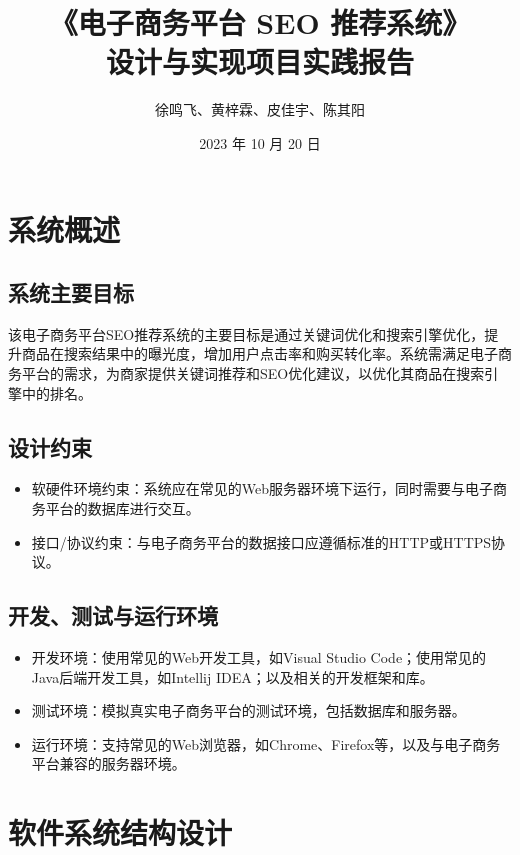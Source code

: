 \documentclass[11pt, a4paper, oneside]{ctexbook}
\title{{\Huge{\textbf{《电子商务平台 SEO 推荐系统》}}}\\设计与实现项目实践报告}
\author{徐鸣飞、黄梓霖、皮佳宇、陈其阳}
\date{2023 年 10 月 20 日}
\begin{document}
\maketitle
{}
\setcounter{page}{1}
\newpage
{}
\setcounter{page}{1}
\tableofcontents
\newpage
\setcounter{page}{1}

\chapter{系统概述}
\section{系统主要目标}
该电子商务平台SEO推荐系统的主要目标是通过关键词优化和搜索引擎优化，提升商品在搜索结果中的曝光度，增加用户点击率和购买转化率。系统需满足电子商务平台的需求，为商家提供关键词推荐和SEO优化建议，以优化其商品在搜索引擎中的排名。
\section{设计约束}
\begin{itemize}
    \item 软硬件环境约束：系统应在常见的Web服务器环境下运行，同时需要与电子商务平台的数据库进行交互。
    \item 接口/协议约束：与电子商务平台的数据接口应遵循标准的HTTP或HTTPS协议。
\end{itemize}
\section{开发、测试与运行环境}
\begin{itemize}
    \item 开发环境：使用常见的Web开发工具，如Visual Studio Code；使用常见的Java后端开发工具，如Intellij IDEA；以及相关的开发框架和库。
    \item 测试环境：模拟真实电子商务平台的测试环境，包括数据库和服务器。
    \item 运行环境：支持常见的Web浏览器，如Chrome、Firefox等，以及与电子商务平台兼容的服务器环境。
\end{itemize}
\chapter{软件系统结构设计}
\end{document}
